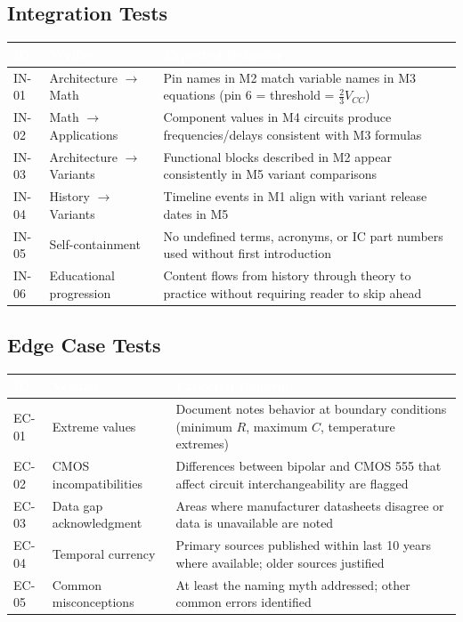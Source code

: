 \documentclass[11pt,letterpaper]{article}
\newcommand{\tableheader}[1]{\textbf{\sffamily\textcolor{white}{#1}}}
\begin{document}
\subsection{Integration Tests}

\begin{center}
\begin{tabularx}{\textwidth}{C{1.2cm}L{3cm}X}
\toprule
{}
\tableheader{ID} & \tableheader{Verifies} & \tableheader{Expected Behavior} \\
\midrule
IN-01 & Architecture $\rightarrow$ Math & Pin names in M2 match variable names in M3 equations (pin 6 = threshold = $\frac{2}{3}V_{CC}$) \\
IN-02 & Math $\rightarrow$ Applications & Component values in M4 circuits produce frequencies/delays consistent with M3 formulas \\
IN-03 & Architecture $\rightarrow$ Variants & Functional blocks described in M2 appear consistently in M5 variant comparisons \\
IN-04 & History $\rightarrow$ Variants & Timeline events in M1 align with variant release dates in M5 \\
IN-05 & Self-containment & No undefined terms, acronyms, or IC part numbers used without first introduction \\
IN-06 & Educational progression & Content flows from history through theory to practice without requiring reader to skip ahead \\
\bottomrule
\end{tabularx}
\end{center}

\subsection{Edge Case Tests}

\begin{center}
\begin{tabularx}{\textwidth}{C{1.2cm}L{3cm}X}
\toprule
{}
\tableheader{ID} & \tableheader{Verifies} & \tableheader{Expected Behavior} \\
\midrule
EC-01 & Extreme values & Document notes behavior at boundary conditions (minimum $R$, maximum $C$, temperature extremes) \\
EC-02 & CMOS incompatibilities & Differences between bipolar and CMOS 555 that affect circuit interchangeability are flagged \\
EC-03 & Data gap acknowledgment & Areas where manufacturer datasheets disagree or data is unavailable are noted \\
EC-04 & Temporal currency & Primary sources published within last 10 years where available; older sources justified \\
EC-05 & Common misconceptions & At least the naming myth addressed; other common errors identified \\
\bottomrule
\end{tabularx}
\end{center}
\end{document}
